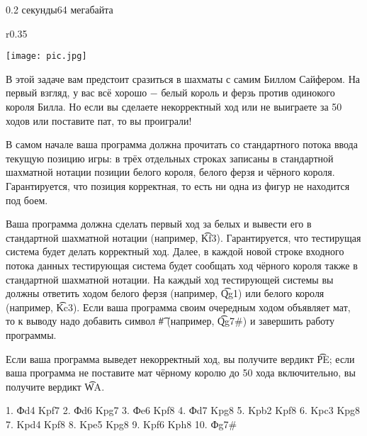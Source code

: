 \begin{problem}{}{}{}{0.2 секунды}{64 мегабайта}

\begin{wrapfigure}{r}{0.35\textwidth}
\vspace{-20pt}
  \begin{center}
    \texttt{[image: pic.jpg]}
  \end{center}
  \vspace{-20pt}
  \vspace{1pt}
\end{wrapfigure}

В этой задаче вам предстоит сразиться в шахматы с самим Биллом Сайфером.
На первый взгляд, у вас всё хорошо $-$ белый король и ферзь против одинокого короля Билла.
Но если вы сделаете некорректный ход или не выиграете за 50 ходов или поставите пат, то вы проиграли!




\InputFile
В самом начале ваша программа должна прочитать со стандартного потока ввода текущую позицию игры:
в трёх отдельных строках записаны в стандартной шахматной нотации позиции белого короля, белого ферзя и чёрного короля.
Гарантируется, что позиция корректная, то есть ни одна из фигур не находится под боем.

\OutputFile
Ваша программа должна сделать первый ход за белых и вывести его в стандартной шахматной нотации (например, {\t{Kf3}}).
Гарантируется, что тестирущая система будет делать корректный ход.
Далее, в каждой новой строке входного потока данных тестирующая система будет сообщать ход чёрного короля 
также в стандартной шахматной нотации. На каждый ход тестирующей системы вы должны ответить ходом белого ферзя (например, {\t{Qg1}})
или белого короля (например, {\t{Kc3}}). Если ваша программа своим очередным ходом объявляет мат, то к выводу надо добавить символ {\t{\#}}
(например, {\t{Qg7\#}}) и завершить работу программы.

Если ваша программа выведет некорректный ход, вы получите вердикт {\t{PE}}; если ваша программа 
не поставите мат чёрному королю до 50 хода включительно, вы получите вердикт {\t{WA}}.

1. Фd4 Kpf7 2. Фd6 Kpg7 3. Фe6 Kpf8 4. Фd7 Kpg8 5. Kpb2 Kpf8 6. Kpc3 Kpg8 7. Kpd4 Kpf8 8. Kpe5 Kpg8 9. Kpf6 Kph8 10. Фg7#
\fi

\Example
\begin{example}
%
\end{example}


\end{problem}
